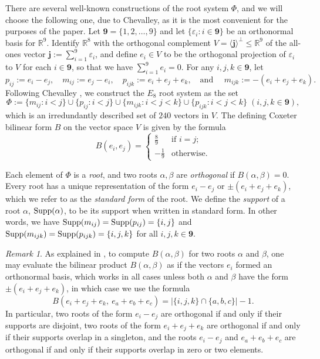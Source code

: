\documentclass[11pt]{amsart}
\theoremstyle{plain}
\theoremstyle{definition}
\theoremstyle{remark}
\newtheorem{rmk}[theorem]{Remark}
\numberwithin{equation}{section}
\newcommand{\al}{\alpha}
\newcommand{\be}{\beta}
\newcommand{\ep}{\varepsilon}
\newcommand{\R}{{\mathbb R}}
\newcommand{\allroots}{\Phi}
\newcommand{\bfj}{\mathbf{j}}
\newcommand{\mr}{m}
\newcommand{\pr}{p}
\newcommand{\nine}{\mathbf{9}}
\DeclareMathOperator{\supp}{\rm{Supp}}
\begin{document}
There are several well-known constructions of the root system $\Phi$, and we
will choose the following one, due to Chevalley, as it is the most convenient
for the purposes of the paper. Let $\nine = \{1, 2, \ldots, 9\}$ and let
$\{\ep_i : i \in \nine\}$ be an orthonormal basis for $\R^9$. Identify $\R^8$
with the orthogonal complement $V = \langle \bfj \rangle^\perp \leq \R^9$ of the
all-ones vector $\bfj := \sum_{i = 1}^9 \ep_i$, and define $e_i \in V$ to be the
orthogonal projection of $\ep_i$ to $V$ for each $i\in \nine$, so that we have
$\sum_{i = 1}^9 e_i = 0$. For any $i,j,k\in \nine$, let \[\pr_{ij} := e_i -
e_j,\quad \mr_{ij} := e_j - e_i, \quad \pr_{ijk} := e_i + e_j + e_k,
\quad\text{and }\quad \mr_{ijk} := -(e_i + e_j + e_k).\] Following Chevalley
\cite[4.VII]{chevalley}, we construct the $E_8$ root system as the set 
\[
    \allroots := \{\mr_{ij} :  i < j \} \cup \{\pr_{ij} :  i < j \} \cup
    \{\mr_{ijk} :  i < j < k \} \cup \{\pr_{ijk} : i < j < k \} \; (i,j,k\in
    \nine),
\] 
which is an irredundantly described set of $240$ vectors in $V$. The defining
Coxeter bilinear form $B$ on the vector space $V$ is given by the formula 
\[
   B(e_i, e_j) = \begin{cases} \frac{8}{9} & \text{if } i = j;\\
  -\frac{1}{9} & \text{otherwise}.
 \end{cases}
\]
   
Each element of $\Phi$ is a \emph{root}, and two roots $\al,\be$ are
\emph{orthogonal} if $B(\al,\be)=0$. Every root has a unique representation of
the form $e_i - e_j$ or $\pm(e_i + e_j + e_k)$, which we refer to as the {\it
standard form} of the root. We define the {\it support} of a root $\al$,
$\supp(\al)$, to be its support when written in standard form. In other words,
we have $\supp(\mr_{ij})=\supp(\pr_{ij})=\{i,j\}$ and
$\supp(\mr_{ijk})=\supp(\pr_{ijk})=\{i,j,k\}$ for all $i,j,k\in \nine$.

\begin{rmk}
\label{rmk:orthog}
As explained in \cite[Section 4.2]{vinberg88}, to compute $B(\al,\be)$ for two
roots $\al$ and $\be$, one may evaluate the bilinear product $B(\al, \be)$ as if
the vectors $e_i$ formed an orthonormal basis, which works in all cases unless both
$\al$ and $\be$ have the form $\pm(e_i + e_j + e_k)$, in which case we use the
formula 
\begin{equation}
\label{eq:overlap}
B(e_i + e_j + e_k, \ e_a + e_b + e_c) = |\{i, j, k\} \cap \{a, b, c\}| - 1 .
\end{equation}
In particular, two roots of the form $e_i - e_j$ are orthogonal if and only if
their supports are disjoint, two roots of the form $e_i + e_j + e_k$ are
orthogonal if and only if their supports overlap in a singleton, and the roots
$e_i - e_j$ and $e_a + e_b + e_c$ are orthogonal if and only if their supports
overlap in zero or two elements. \end{rmk}
\end{document}
